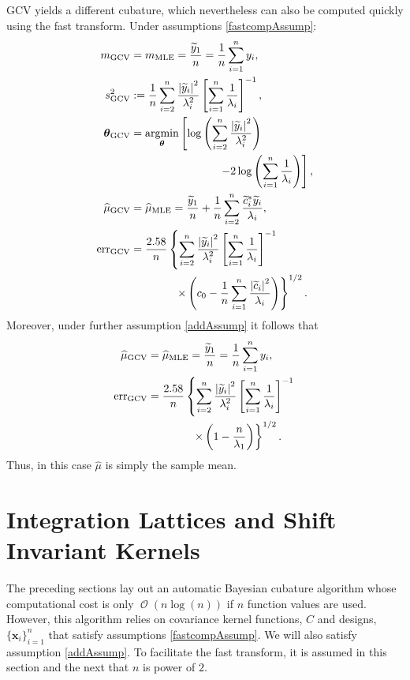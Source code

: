 \documentclass[twocolumn]{svjour3}          %
\DeclareMathOperator{\Order}{{\mathcal O}}
\newcommand{\bm}[1]{\boldsymbol{#1}}
\newcommand{\vtheta}{{\bm{\theta}}}
\newcommand{\vx}{\bm{x}}
\newcommand{\hmu}{\widehat{\mu}}
\newcommand{\MLE}{\text{MLE}}
\newcommand{\err}{\textup{err}}
\def\abs#1{\ensuremath{\left \lvert #1 \right \rvert}}
\providecommand{\argmin}{\operatorname*{argmin}}
\begin{document}
GCV yields a different cubature, which nevertheless can also be computed quickly using the fast transform.  Under assumptions \eqref{fastcompAssump}:
\begin{align}
\nonumber
m_{\textup{GCV}} & = m_\MLE =  \frac{\widetilde{y}_1}{n} = \frac 1n \sum_{i=1}^n y_i,\\
\nonumber 
s^2_{\textup{GCV}} & : =  \frac 1{n} \sum_{i=2}^n \frac{\abs{\widetilde{y}_i}^2}{\lambda_i^2}  \left [ \sum_{i=1}^n \frac{1}{\lambda_i} \right]^{-1}, \\
\nonumber 
\vtheta_{\textup{GCV}} 
&= \argmin_\vtheta \left[ \log \left ( \sum_{i=2}^n \frac{\abs{\widetilde{y}_i}^2}{\lambda_i^2} 
\right) \right .\\
\label{thetaGCV}
& \qquad \qquad \qquad \qquad  \left . -2\log\left( \sum_{i=1}^n \frac{1}{\lambda_i} \right)
\right], \\
\hmu_{\textup{GCV}}
&= \hmu_\MLE  = \frac{\widetilde{y}_1}{n} +
\frac 1n \sum_{i=2}^n \frac{ \widetilde{c}_i^* \widetilde{y}_i}{\lambda_i}, \\
\err_{\textup{GCV}} & =
\frac{2.58}{n}\left\{\sum_{i=2}^n \frac{\abs{\widetilde{y}_i}^2}{\lambda_i^2}  \left [ \sum_{i=1}^n \frac{1}{\lambda_i} \right]^{-1} \right.
\\ 
&\qquad \qquad \left . \times
\left( c_0 - \frac 1n \sum_{i=1}^n \frac{\abs{\widetilde{c}_i}^2}{\lambda_i} \right) 
\right\}^{1/2}.
\end{align}
Moreover, under further assumption \eqref{addAssump} it follows that 
\begin{align}
\nonumber
\widehat{\mu}_{\textup{GCV}}
&= \hmu_\MLE =
\frac{\widetilde{y}_1}{n} = \frac 1n \sum_{i=1}^n y_i,\\
\nonumber
\err_{\textup{GCV}} & =
\frac{2.58}{n}\left\{\sum_{i=2}^n \frac{\abs{\widetilde{y}_i}^2}{\lambda_i^2}  \left [ \sum_{i=1}^n \frac{1}{\lambda_i} \right]^{-1} \right.
\\ 
&\qquad \qquad \left . \times
\left( 1 -  \frac{n}{\lambda_1} \right)  
\right\}^{1/2}. \label{errGCVSimple}
\end{align}
Thus, in this  case $\hmu$ is simply the sample mean.



\section{Integration Lattices and Shift Invariant Kernels}
\label{sec:shift_invariant_kernel}

The preceding sections lay out an automatic Bayesian cubature algorithm whose computational cost is only $\Order(n \log(n))$ if $n$ function values are used.  However, this algorithm relies on covariance kernel functions, $C$ and designs, $\{\vx_i\}_{i=1}^n$ that satisfy assumptions \eqref{fastcompAssump}.  We will also satisfy assumption \eqref{addAssump}.  To facilitate the fast transform, it is assumed in this section and the next that $n$ is power of $2$.  
\end{document}
